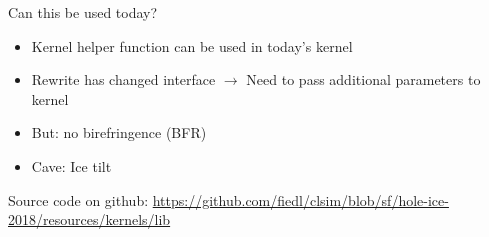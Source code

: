 
\begin{frame}[fragile]{Can this be used today?}

  \begin{itemize}
    \item Kernel helper function can be used in today's kernel
    \item Rewrite has changed interface $\rightarrow$ Need to \alert{pass additional parameters} to kernel
    \item But: \alert{no birefringence} (BFR)
    \item Cave: Ice tilt
  \end{itemize}

  \vspace{2em}

  Source code on github: \url{https://github.com/fiedl/clsim/blob/sf/hole-ice-2018/resources/kernels/lib}

\end{frame}
